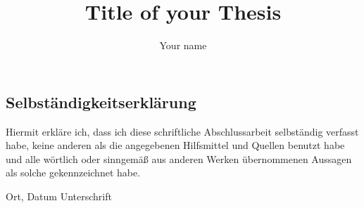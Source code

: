 \documentclass{mimosis}
\title{Title of your Thesis}
\author{Your name}
\theoremstyle{definition}
\theoremstyle{remark}
\begin{document}
\frontmatter

  
  \setcounter{page}{1}
  

  \tableofcontents

\mainmatter

  

  
  
  
  
  
  
  

\backmatter
  \printbibliography

  \thispagestyle{empty}
  \begin{otherlanguage}{ngerman}
  \chapter*{Selbständigkeitserklärung}
  Hiermit erkläre ich, dass ich diese schriftliche Abschlussarbeit selbständig verfasst habe, keine
  anderen als die angegebenen Hilfsmittel und Quellen benutzt habe und alle wörtlich oder
  sinngemäß aus anderen Werken übernommenen Aussagen als solche gekennzeichnet habe.
  
  \vspace{1cm} 
  \noindent
  \hrulefill \hspace{2.5cm} \hrulefill
  
  \noindent
  Ort, Datum \hfill Unterschrift
  \end{otherlanguage}
\end{document}
